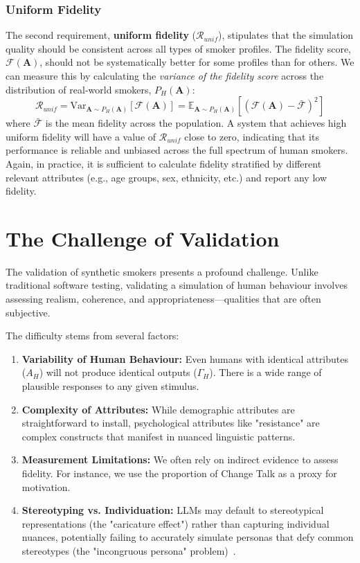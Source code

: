 \subsubsection{Uniform Fidelity}

The second requirement, \textbf{uniform fidelity} ($\mathcal{R}_{unif}$), stipulates that the simulation quality should be consistent across all types of smoker profiles. The fidelity score, $\mathcal{F}(\textbf{A})$, should not be systematically better for some profiles than for others. We can measure this by calculating the \textit{variance of the fidelity score} across the distribution of real-world smokers, $P_H(\textbf{A})$:
$$\mathcal{R}_{unif} = \text{Var}_{\textbf{A} \sim P_H(\textbf{A})}[\mathcal{F}(\textbf{A})] = \mathbb{E}_{\textbf{A} \sim P_H(\textbf{A})} [(\mathcal{F}(\textbf{A}) - \bar{\mathcal{F}})^2]$$
where $\bar{\mathcal{F}}$ is the mean fidelity across the population. A system that achieves high uniform fidelity will have a value of $\mathcal{R}_{unif}$ close to zero, indicating that its performance is reliable and unbiased across the full spectrum of human smokers. Again, in practice, it is sufficient to calculate fidelity stratified by different relevant attributes (e.g., age groups, sex, ethnicity, etc.) and report any low fidelity.



\section{The Challenge of Validation}
\label{sec:synthetic-smoker-validation-challenge}

The validation of synthetic smokers presents a profound challenge. Unlike traditional software testing, validating a simulation of human behaviour involves assessing realism, coherence, and appropriateness—qualities that are often subjective.

The difficulty stems from several factors:

\begin{enumerate}
    \item \textbf{Variability of Human Behaviour:} Even humans with identical attributes ($A_H$) will not produce identical outputs ($\Gamma_H$). There is a wide range of plausible responses to any given stimulus.
    \item \textbf{Complexity of Attributes:} While demographic attributes are straightforward to install, psychological attributes like "resistance" are complex constructs that manifest in nuanced linguistic patterns.
    \item \textbf{Measurement Limitations:} We often rely on indirect evidence to assess fidelity. For instance, we use the proportion of Change Talk as a proxy for motivation.
    \item \textbf{Stereotyping vs. Individuation:} LLMs may default to stereotypical representations (the "caricature effect") rather than capturing individual nuances, potentially failing to accurately simulate personas that defy common stereotypes (the "incongruous persona" problem)~\citep{liu2024evaluating}.
\end{enumerate}

